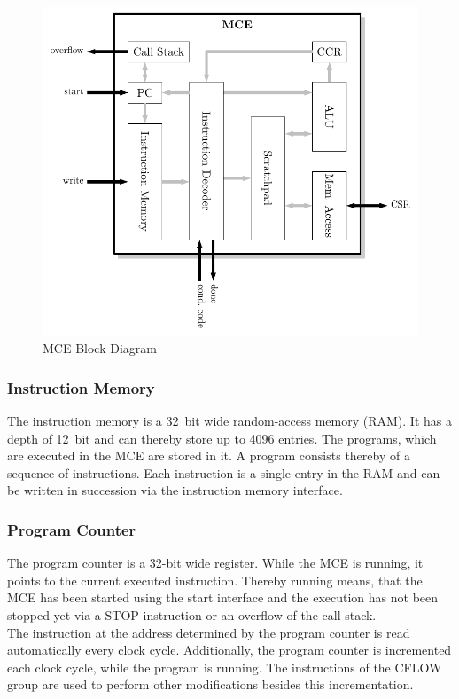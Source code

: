 \begin{figure}[htb]
 \centering
 \includegraphics[scale=1.0]{images/mce_block}
 \caption{MCE Block Diagram}
\label{fig:mce_block}
\end{figure}

\subsubsection{Instruction Memory}
The instruction memory is a 32~bit wide random-access memory (RAM).
It has a depth of 12~bit and can thereby store up to 4096 entries.
The programs, which are executed in the MCE are stored in it.
A program consists thereby of a sequence of instructions.
Each instruction is a single entry in the RAM and can be written in succession via the instruction memory interface.

\subsubsection{Program Counter}

The program counter is a 32-bit wide register.
While the MCE is running, it points to the current executed instruction.
Thereby running means, that the MCE has been started using the start interface and the execution has not been stopped yet via a STOP instruction or an overflow of the call stack.\\
The instruction at the address determined by the program counter is read automatically every clock cycle.
Additionally, the program counter is incremented each clock cycle, while the program is running.
The instructions of the CFLOW group are used to perform other modifications besides this incrementation.

